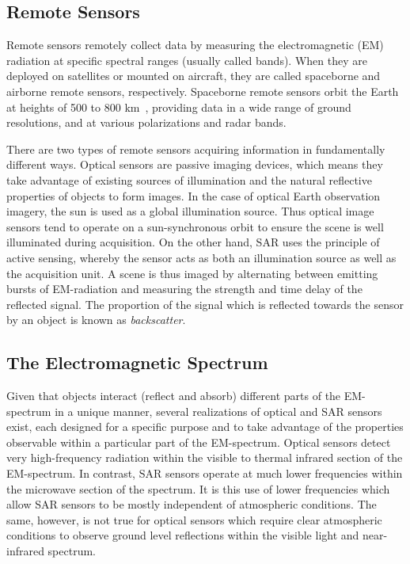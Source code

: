 \subsection{Remote Sensors}
Remote sensors remotely collect data by measuring the electromagnetic (EM) radiation at specific spectral ranges (usually called bands). 
When they are deployed on satellites or mounted on aircraft, they are called spaceborne and airborne remote sensors, respectively.
 Spaceborne remote sensors orbit the Earth at heights of 500 to 800 km~\citep{everaerts2005pegasus}, providing data in a wide range of ground resolutions, and at various polarizations and radar bands. 

There are two types of remote sensors acquiring information in fundamentally different ways.
Optical sensors are passive imaging devices, which means they take advantage of existing sources of illumination and the natural reflective properties of objects to form
images. 
In the case of optical Earth observation imagery, the sun is used as a global illumination source. 
Thus optical image sensors tend to operate on a sun-synchronous orbit to ensure the scene is well illuminated during acquisition. 
On the other hand, SAR uses the principle of active sensing, whereby the sensor acts as both an illumination source as well as the acquisition unit. 
A scene is thus imaged by alternating between emitting bursts of EM-radiation and measuring the strength and time delay of the reflected signal. 
The proportion of the signal which is reflected towards the sensor by an object is known as \textit{backscatter}.
\subsection{The Electromagnetic Spectrum}
Given that objects interact (reflect and absorb) different parts of the EM-spectrum in a unique manner, several realizations of optical and SAR sensors exist, each designed for
a specific purpose and to take advantage of the properties observable within a particular part of the EM-spectrum.
Optical sensors detect very high-frequency radiation within the visible to thermal infrared section of the EM-spectrum.
In contrast, SAR sensors operate at much lower frequencies within the microwave section of the spectrum.
It is this use of lower frequencies which allow SAR sensors to be mostly independent of atmospheric conditions.
The same, however, is not true for optical sensors which require clear atmospheric conditions to observe ground level reflections within the visible light and near-infrared spectrum.

